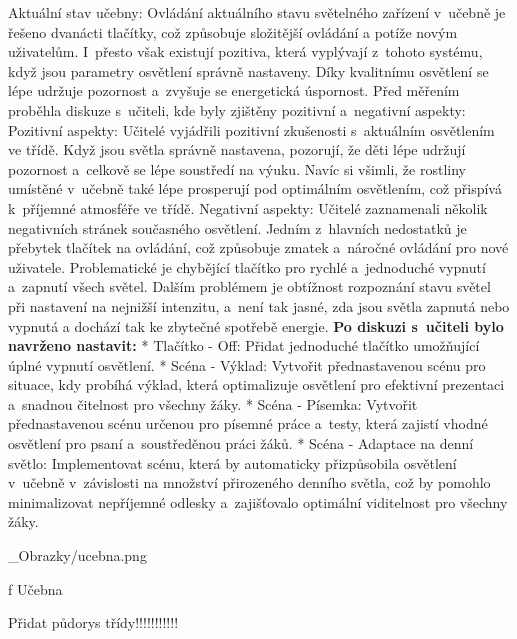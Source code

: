\sec Aktuální stav učebny:
\medskip
Ovládání aktuálního stavu světelného zařízení v~učebně je řešeno dvanácti tlačítky, což způsobuje složitější ovládání
a potíže novým uživatelům. I~přesto však existují pozitiva, která vyplývají z~tohoto systému, když jsou parametry
osvětlení správně nastaveny. Díky kvalitnímu osvětlení se lépe udržuje pozornost a~zvyšuje se energetická úspornost.
\medskip
Před měřením proběhla diskuze s~učiteli, kde byly zjištěny pozitivní a~negativní aspekty:
\medskip
{\sbf Pozitivní aspekty:}
Učitelé vyjádřili pozitivní zkušenosti s~aktuálním osvětlením ve třídě. Když jsou světla správně nastavena,
pozorují, že děti lépe udržují pozornost a~celkově se lépe soustředí na výuku. Navíc si všimli, že rostliny
umístěné v~učebně také lépe prosperují pod optimálním osvětlením, což přispívá k~příjemné atmosféře ve třídě.
\medskip
{\sbf Negativní aspekty:}
Učitelé zaznamenali několik negativních stránek současného osvětlení. Jedním z~hlavních nedostatků je přebytek
tlačítek na ovládání, což způsobuje zmatek a~náročné ovládání pro nové uživatele. Problematické je chybějící
tlačítko pro rychlé a~jednoduché vypnutí a~zapnutí všech světel. Dalším problémem je obtížnost rozpoznání
stavu světel při nastavení na nejnižší intenzitu, a~není tak jasné, zda jsou světla zapnutá nebo vypnutá
a dochází tak ke zbytečné spotřebě energie.
\medskip
{\bf Po diskuzi s~učiteli bylo navrženo nastavit:}
\medskip
\begitems
    * {\sbf Tlačítko - Off:} Přidat jednoduché tlačítko umožňující úplné vypnutí osvětlení.
\medskip
    * {\sbf Scéna - Výklad:} Vytvořit přednastavenou scénu pro situace, kdy probíhá výklad, která optimalizuje
    osvětlení pro efektivní prezentaci a~snadnou čitelnost pro všechny žáky.
\medskip
    * {\sbf Scéna - Písemka:} Vytvořit přednastavenou scénu určenou pro písemné práce a~testy, která
    zajistí vhodné osvětlení pro psaní a~soustředěnou práci žáků.
\medskip
    * {\sbf Scéna - Adaptace na denní světlo:} Implementovat scénu, která by automaticky přizpůsobila
    osvětlení v~učebně v~závislosti na množství přirozeného denního světla, což by pomohlo minimalizovat
    nepříjemné odlesky a~zajišťovalo optimální viditelnost pro všechny žáky.
\enditems

\medskip {}
\picw=15cm _Obrazky/ucebna.png
\caption/f Učebna
\medskip

Přidat půdorys třídy!!!!!!!!!!!






